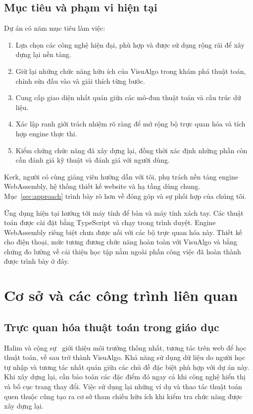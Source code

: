 \documentclass[11pt,a4paper]{article}
\begin{document}
\subsection{Mục tiêu và phạm vi hiện tại}
Dự án có năm mục tiêu làm việc:
\begin{enumerate}
\item Lựa chọn các công nghệ hiện đại, phù hợp và được sử dụng rộng rãi để xây dựng lại nền tảng.
\item Giữ lại những chức năng hữu ích của VisuAlgo trong khám phá thuật toán, chỉnh sửa đầu vào và giải thích từng bước.
\item Cung cấp giao diện nhất quán giữa các mô-đun thuật toán và cấu trúc dữ liệu.
\item Xác lập ranh giới trách nhiệm rõ ràng để mở rộng bộ trực quan hóa và tích hợp engine thực thi.
\item Kiểm chứng chức năng đã xây dựng lại, đồng thời xác định những phần còn cần đánh giá kỹ thuật và đánh giá với người dùng.
\end{enumerate}

Kerk, người có cùng giảng viên hướng dẫn với tôi, phụ trách nền tảng engine WebAssembly, hệ thống thiết kế website và hạ tầng dùng chung. Mục~\ref{sec:approach} trình bày rõ hơn về đóng góp và sự phối hợp của chúng tôi.

Ứng dụng hiện tại hướng tới máy tính để bàn và máy tính xách tay. Các thuật toán được cài đặt bằng TypeScript và chạy trong trình duyệt. Engine WebAssembly riêng biệt chưa được nối với các bộ trực quan hóa này. Thiết kế cho điện thoại, mức tương đương chức năng hoàn toàn với VisuAlgo và bằng chứng đo lường về cải thiện học tập nằm ngoài phần công việc đã hoàn thành được trình bày ở đây.

\nextsection
\section{Cơ sở và các công trình liên quan}
\subsection{Trực quan hóa thuật toán trong giáo dục}
Halim và cộng sự~\cite{halim2012} giới thiệu môi trường thống nhất, tương tác trên web để học thuật toán, về sau trở thành VisuAlgo. Khả năng sử dụng dữ liệu do người học tự nhập và tương tác nhất quán giữa các chủ đề đặc biệt phù hợp với dự án này. Khi xây dựng lại, cần bảo toàn các đặc điểm đó ngay cả khi công nghệ hiển thị và bố cục trang thay đổi. Việc sử dụng lại những ví dụ và thao tác thuật toán quen thuộc cũng tạo ra cơ sở tham chiếu hữu ích khi kiểm tra chức năng được xây dựng lại.
\end{document}
